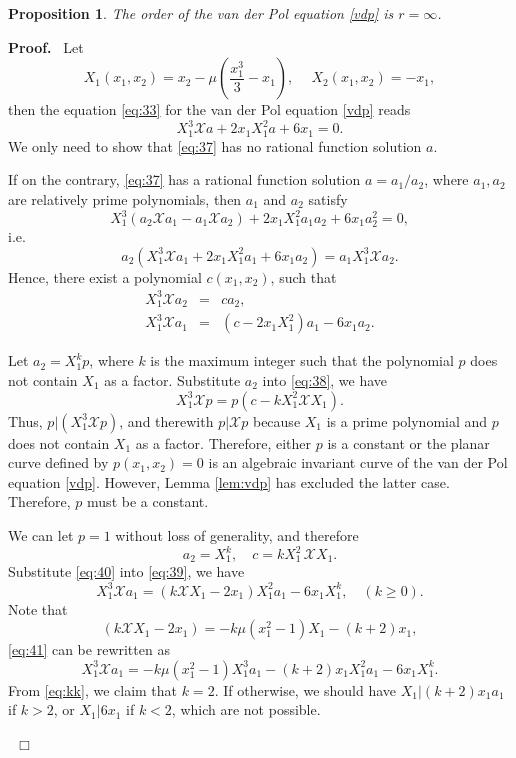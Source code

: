 \documentclass[preprint,12pt]{elsarticle}
\newtheorem{prop}[thm]{Proposition}
\newenvironment{proof}[1][Proof]{\textbf{#1.}\ }{\ $\Box$}
\begin{document}
\begin{prop}
\label{cor:2} 
The order of the van der Pol equation \eqref{vdp} is $r=\infty$.
\end{prop}
\begin{proof}
Let
$$X_1(x_1,x_2) = x_2 - \mu
(\dfrac{x_1^3}{3} - x_1),\quad \ X_2(x_1,x_2) = -x_1,$$ 
then the equation
\eqref{eq:33} for the van der Pol equation \eqref{vdp} reads
\begin{equation}
\label{eq:37} X_1^3  \mathscr{X}a + 2 x_1 X_1^2  a + 6 x_1 = 0.
\end{equation}
We only need to show that \eqref{eq:37} has no rational
function solution $a$. 

If on the contrary, \eqref{eq:37} has a rational function
solution $a = a_1/a_2$, where $a_1, a_2$ are relatively prime
polynomials, then $a_1$ and $a_2$ satisfy
$$X_1^3 (a_2 \mathscr{X} a_1 - a_1 \mathscr{X}a_2) + 2 x_1 X_1^2 a_1 a_2 + 6  x_1 a_2^2 = 0,$$
i.e.
$$a_2 (X_1^3 \mathscr{X}a_1 + 2 x_1 X_1^2 a_1 + 6 x_1 a_2) =  a_1 X_1^3 \mathscr{X}a_2.$$
Hence, there exist a polynomial $c(x_1,x_2)$, such that
\begin{eqnarray}
\label{eq:38} X_1^3  \mathscr{X} a_2 &=& c  a_2,\\
\label{eq:39} X_1^3  \mathscr{X} a_1 &=& (c - 2  x_1  X_1^2) a_1 - 6
x_1 a_2.
\end{eqnarray}

Let $a_2 = X_1^k p$, where $k$ is the maximum integer such that the polynomial $p$ does not contain $X_1$ as a factor. Substitute $a_2$ into
\eqref{eq:38}, we have
$$X_1^3 \mathscr{X} p = p (c -  k   X_1^2 \mathscr{X} X_1).$$
Thus, $p| (X_1^3 \mathscr{X}p)$, and therewith $p | \mathscr{X}p$ because $X_1$ is a prime polynomial and $p$ does not contain $X_1$ as a factor. Therefore, either $p$ is a constant or the planar curve defined by $p(x_1,x_2)=0$ is an algebraic invariant curve of the van der Pol equation
\eqref{vdp}. However, Lemma \ref{lem:vdp} has excluded the latter case. Therefore, $p$ must be a constant. 

We can let $p = 1$ without loss of generality, and therefore
\begin{equation}
\label{eq:40} a_2 = X_1^k,\quad c = k X_1^2\, \mathscr{X}X_1.
\end{equation}
Substitute \eqref{eq:40} into \eqref{eq:39}, we have
\begin{equation}
\label{eq:41} X_1^3 \mathscr{X}a_1 = (k \mathscr{X}X_1 - 2  x_1
) X_1^2 a_1 - 6  x_1 X_1^k,\quad (k\geq 0).
\end{equation}
Note that
$$(k \mathscr{X}X_1 - 2 x_1) = -k \mu (x_1^2 - 1) X_1 - (k + 2) x_1,$$
\eqref{eq:41} can be rewritten as 
\begin{equation}
\label{eq:kk}
X_1^3 \mathscr{X}a_1 = -k \mu (x_1^2 - 1) X_1^3 a_1 - (k + 2) x_1 X_1^2 a_1 - 6 x_1 X_1^k.
\end{equation}
From \eqref{eq:kk}, we claim that $k = 2$. If otherwise, we should have  $X_1|(k+2) x_1a_1$ if $k > 2$, or $X_1| 6 x_1$ if $k < 2$, which are not possible. 


\end{proof}
\end{document}
